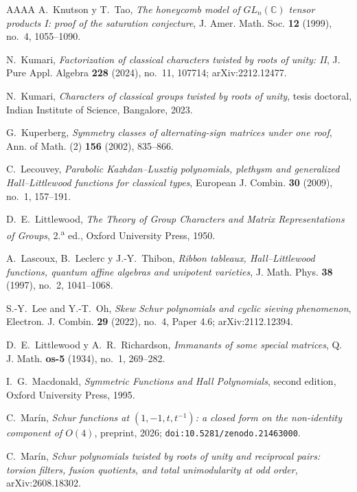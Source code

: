 \documentclass[11pt,reqno]{amsart}
\theoremstyle{plain}
\theoremstyle{definition}
\newcommand{\CC}{\mathbb{C}}
\begin{document}
\begin{thebibliography}{AAAA}
 A.~Knutson y T.~Tao, \emph{The honeycomb model of $GL_n(\CC)$ tensor
products I: proof of the saturation conjecture}, J. Amer. Math. Soc. \textbf{12} (1999), no.~4,
1055--1090.

 N.~Kumari, \emph{Factorization of classical characters twisted by roots of
unity: II}, J. Pure Appl. Algebra \textbf{228} (2024), no.~11, 107714; arXiv:2212.12477.

 N.~Kumari, \emph{Characters of classical groups twisted by roots of
unity}, tesis doctoral, Indian Institute of Science, Bangalore, 2023.

 G.~Kuperberg, \emph{Symmetry classes of alternating-sign matrices under one
roof}, Ann. of Math. (2) \textbf{156} (2002), 835--866.

 C.~Lecouvey, \emph{Parabolic Kazhdan--Lusztig polynomials, plethysm and
generalized Hall--Littlewood functions for classical types}, European J. Combin. \textbf{30} (2009),
no.~1, 157--191.

 D.~E.~Littlewood, \emph{The Theory of Group Characters and Matrix
Representations of Groups}, 2.\textsuperscript{a} ed., Oxford University Press, 1950.

 A.~Lascoux, B.~Leclerc y J.-Y.~Thibon, \emph{Ribbon tableaux,
Hall--Littlewood functions, quantum affine algebras and unipotent varieties}, J. Math. Phys.
\textbf{38} (1997), no.~2, 1041--1068.

 S.-Y.~Lee and Y.-T.~Oh, \emph{Skew Schur polynomials and cyclic sieving
phenomenon}, Electron. J. Combin. \textbf{29} (2022), no.~4, Paper 4.6; arXiv:2112.12394.

 D.~E.~Littlewood y A.~R.~Richardson, \emph{Immanants of some special
matrices}, Q. J. Math. \textbf{os-5} (1934), no.~1, 269--282.

 I.~G.~Macdonald, \emph{Symmetric Functions and Hall Polynomials}, second
edition, Oxford University Press, 1995.

 C.~Mar\'in, \emph{Schur functions at $(1,-1,t,t^{-1})$: a closed form on the
non-identity component of $O(4)$}, preprint, 2026; \texttt{doi:10.5281/zenodo.21463000}.

 C.~Mar\'in, \emph{Schur polynomials twisted by roots of unity
and reciprocal pairs: torsion filters, fusion quotients, and total unimodularity at odd
order}, arXiv:2608.18302.


\end{thebibliography}
\end{document}
